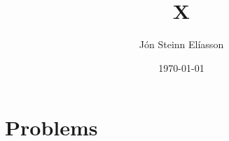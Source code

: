 \documentclass[11pt,a4paper,notitlepage]{article}
\title{X}
\date{\today}
\author{Jón Steinn Elíasson}
\begin{document}
\maketitle%
\tableofcontents%
\vfill%
\clearpage%
\section{Problems}
\end{document}
